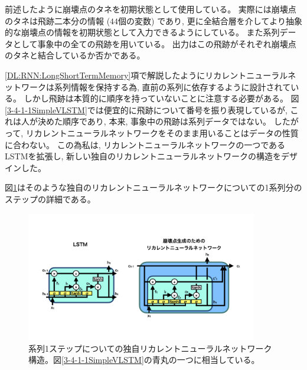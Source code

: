 前述したように崩壊点のタネを初期状態として使用している。
実際には崩壊点のタネは飛跡二本分の情報 ($44$個の変数) であり, 更に全結合層を介してより抽象的な崩壊点の情報を初期状態として入力できるようにしている。
また系列データとして事象中の全ての飛跡を用いている。
出力はこの飛跡がそれぞれ崩壊点のタネと結合しているか否かである。

\ref{DL:RNN:LongShortTermMemory}項で解説したようにリカレントニューラルネットワークは系列情報を保持する為, 直前の系列に依存するように設計されている。
しかし飛跡は本質的に順序を持っていないことに注意する必要がある。
図\ref{3-4-1-1SimpleVLSTM}では便宜的に飛跡について番号を振り表現しているが, これは人が決めた順序であり, 本来, 事象中の飛跡は系列データではない。
したがって, リカレントニューラルネットワークをそのまま用いることはデータの性質に合わない。
この為私は, リカレントニューラルネットワークの一つであるLSTMを拡張し, 新しい独自のリカレントニューラルネットワークの構造をデザインした。

図\ref{3-4-1-2VLSTMStructure}はそのような独自のリカレントニューラルネットワークについての1系列分のステップの詳細である。

\begin{figure}[htbp]
 \centering
 \includegraphics[trim = 0 100 0 200, width=0.9\textwidth, clip]{Figure/3Networks/3-4-1-2VLSTMStructure.png}
 \caption[系列1ステップについての独自リカレントニューラルネットワーク構造]{系列1ステップについての独自リカレントニューラルネットワーク構造。図\ref{3-4-1-1SimpleVLSTM}の青丸の一つに相当している。}
 \label{3-4-1-2VLSTMStructure}
\end{figure}

